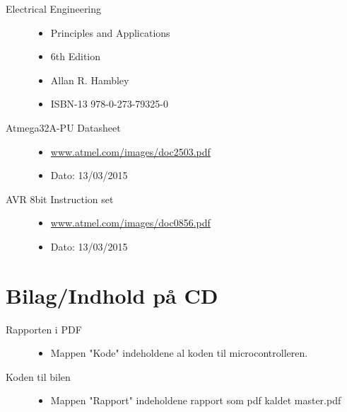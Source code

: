 \begin{description}
	\item[Electrical Engineering] \hfill
		\begin{itemize}
			\item Principles and Applications
			\item 6th Edition
			\item Allan R. Hambley
			\item ISBN-13 978-0-273-79325-0
		\end{itemize}
	\item[Atmega32A-PU Datasheet] \hfill
		\begin{itemize}
			\item \url{www.atmel.com/images/doc2503.pdf}
			\item Dato: 13/03/2015
		\end{itemize}
	\item[AVR 8bit Instruction set] \hfill
		\begin{itemize}
			\item \url{www.atmel.com/images/doc0856.pdf}
			\item Dato: 13/03/2015
		\end{itemize}
\end{description}

\section{Bilag/Indhold på CD}

\begin{description}
	\item[Rapporten i PDF] \hfill
		\begin{itemize}
			\item Mappen "Kode" indeholdene al koden til microcontrolleren.
		\end{itemize}
	\item[Koden til bilen] \hfill
		\begin{itemize}
			\item Mappen "Rapport" indeholdene rapport som pdf kaldet master.pdf
		\end{itemize}
\end{description}